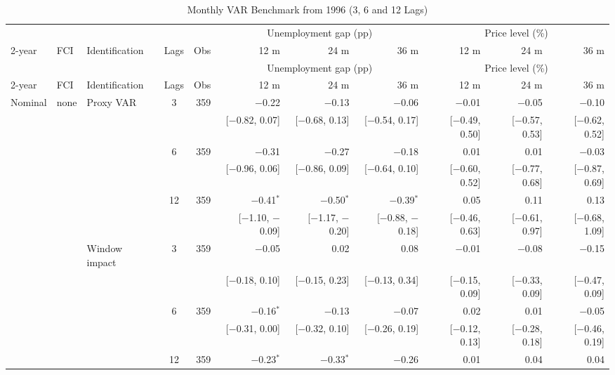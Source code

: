 \begingroup\scriptsize\setlength{\tabcolsep}{0.9pt}
\begin{longtable}{lllcrrrrrrr}
\caption{Monthly VAR Benchmark from 1996 (3, 6 and 12 Lags)}\label{tab:appmonthly}\\
\toprule
 & & & & & \multicolumn{3}{c}{Unemployment gap (pp)} & \multicolumn{3}{c}{Price level (\%)}\\ \cmidrule(lr){6-8}\cmidrule(lr){9-11}
2-year & FCI & Identification & Lags & Obs & 12 m & 24 m & 36 m & 12 m & 24 m & 36 m\\
\midrule\endfirsthead
\toprule
 & & & & & \multicolumn{3}{c}{Unemployment gap (pp)} & \multicolumn{3}{c}{Price level (\%)}\\ \cmidrule(lr){6-8}\cmidrule(lr){9-11}
2-year & FCI & Identification & Lags & Obs & 12 m & 24 m & 36 m & 12 m & 24 m & 36 m\\
\midrule\endhead
\bottomrule\endfoot
Nominal & none & Proxy VAR & 3 & 359 & $-$0.22 & $-$0.13 & $-$0.06 & $-$0.01 & $-$0.05 & $-$0.10\\
 & & & & & {\tiny [$-$0.82, 0.07]} & {\tiny [$-$0.68, 0.13]} & {\tiny [$-$0.54, 0.17]} & {\tiny [$-$0.49, 0.50]} & {\tiny [$-$0.57, 0.53]} & {\tiny [$-$0.62, 0.52]}\\
 &  &  & 6 & 359 & $-$0.31 & $-$0.27 & $-$0.18 & 0.01 & 0.01 & $-$0.03\\
 & & & & & {\tiny [$-$0.96, 0.06]} & {\tiny [$-$0.86, 0.09]} & {\tiny [$-$0.64, 0.10]} & {\tiny [$-$0.60, 0.52]} & {\tiny [$-$0.77, 0.68]} & {\tiny [$-$0.87, 0.69]}\\
 &  &  & 12 & 359 & $-$0.41$^{*}$ & $-$0.50$^{*}$ & $-$0.39$^{*}$ & 0.05 & 0.11 & 0.13\\
 & & & & & {\tiny [$-$1.10, $-$0.09]} & {\tiny [$-$1.17, $-$0.20]} & {\tiny [$-$0.88, $-$0.18]} & {\tiny [$-$0.46, 0.63]} & {\tiny [$-$0.61, 0.97]} & {\tiny [$-$0.68, 1.09]}\\
 &  & Window impact & 3 & 359 & $-$0.05 & 0.02 & 0.08 & $-$0.01 & $-$0.08 & $-$0.15\\
 & & & & & {\tiny [$-$0.18, 0.10]} & {\tiny [$-$0.15, 0.23]} & {\tiny [$-$0.13, 0.34]} & {\tiny [$-$0.15, 0.09]} & {\tiny [$-$0.33, 0.09]} & {\tiny [$-$0.47, 0.09]}\\
 &  &  & 6 & 359 & $-$0.16$^{*}$ & $-$0.13 & $-$0.07 & 0.02 & 0.01 & $-$0.05\\
 & & & & & {\tiny [$-$0.31, 0.00]} & {\tiny [$-$0.32, 0.10]} & {\tiny [$-$0.26, 0.19]} & {\tiny [$-$0.12, 0.13]} & {\tiny [$-$0.28, 0.18]} & {\tiny [$-$0.46, 0.19]}\\
 &  &  & 12 & 359 & $-$0.23$^{*}$ & $-$0.33$^{*}$ & $-$0.26 & 0.01 & 0.04 & 0.04\\

\end{longtable}
